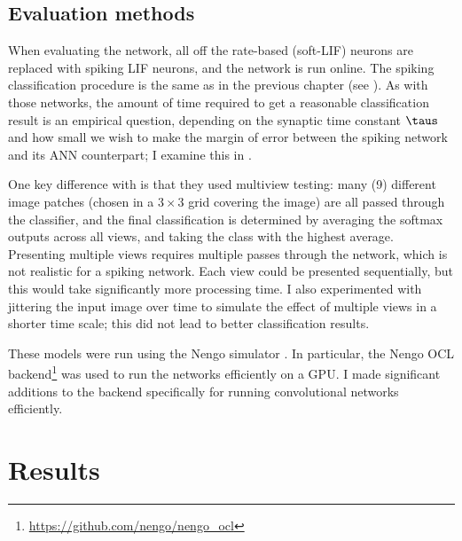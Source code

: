 \subsection{Evaluation methods}

When evaluating the network,
all off the rate-based (soft-LIF) neurons are replaced with spiking LIF neurons,
and the network is run online.
The spiking classification procedure is the same as in the previous chapter
(see ).
As with those networks,
the amount of time required to get a reasonable classification result
is an empirical question,
depending on the synaptic time constant $\taus$
and how small we wish to make the margin of error between the spiking network
and its ANN counterpart;
I examine this in .

One key difference with \textcite{Krizhevsky2012}
is that they used multiview testing:
many (9) different image patches (chosen in a $3 \times 3$ grid covering the image)
are all passed through the classifier,
and the final classification is determined by averaging the softmax outputs
across all views,
and taking the class with the highest average.
Presenting multiple views requires multiple passes through the network,
which is not realistic for a spiking network.
Each view could be presented sequentially,
but this would take significantly more processing time.
I also experimented with jittering the input image over time
to simulate the effect of multiple views in a shorter time scale;
this did not lead to better classification results.

These models were run using the Nengo simulator \parencite{Bekolay2014}.
In particular, the Nengo OCL backend\footnote{
  \url{https://github.com/nengo/nengo_ocl}}
was used to run the networks efficiently on a GPU.
I made significant additions to the backend
specifically for running convolutional networks efficiently.



\section{Results}

